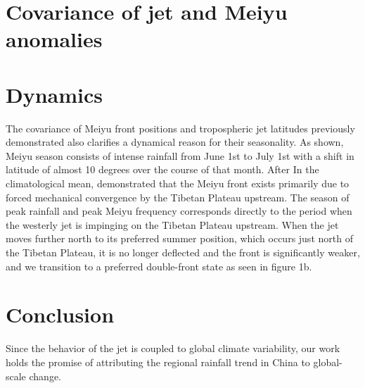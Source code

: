 \documentclass[draft,grl]{AGUTeX}
\begin{document}
\begin{article}
\section{Covariance of jet and Meiyu anomalies}

	
\section{Dynamics}

	The covariance of Meiyu front positions and tropospheric jet latitudes previously demonstrated also clarifies a dynamical reason for their seasonality. As shown, Meiyu season consists of intense rainfall from June 1st to July 1st with a shift in latitude of almost 10 degrees over the course of that month. After  In the climatological mean, \cite{Chen2014} demonstrated that the Meiyu front exists primarily due to forced mechanical convergence by the Tibetan Plateau upstream. The season of peak rainfall and peak Meiyu frequency corresponds directly to the period when the westerly jet is impinging on the Tibetan Plateau upstream. When the jet moves further north to its preferred summer position, which occurs just north of the Tibetan Plateau, it is no longer deflected and the front is significantly weaker, and we transition to a preferred double-front state as seen in figure 1b. 
	

\section{Conclusion}
 Since the behavior of the jet is coupled to global climate variability, our work holds the promise of attributing the regional rainfall trend in China to global-scale change.


\end{article}
\end{document}
